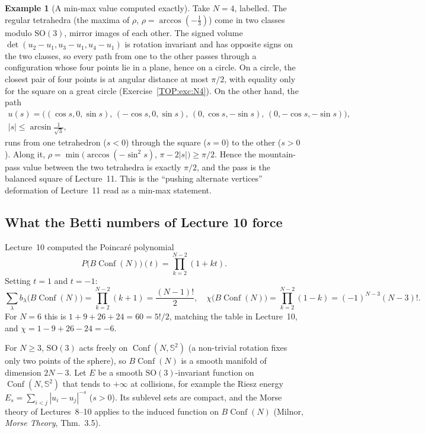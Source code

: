 \documentclass[11pt,openany]{book}
\theoremstyle{plain}
\theoremstyle{definition}
\newtheorem{example}[theorem]{Example}
\theoremstyle{remark}
\newcommand{\Sph}{\mathbb{S}}          %
\newcommand{\SO}{\mathrm{SO}}
\newcommand{\Conf}{\operatorname{Conf}}
\newcommand{\abs}[1]{\left\lvert #1 \right\rvert}
\begin{document}
\begin{example}[A min-max value computed exactly]\label{TOP:ex:N4pass}
Take $N=4$, labelled. The regular tetrahedra (the maxima of $\rho$, $\rho=\arccos(-\tfrac13)$) come
in two classes modulo $\SO(3)$, mirror images of each other. The signed volume
$\det(u_2-u_1,u_3-u_1,u_4-u_1)$ is rotation invariant and has opposite signs on the two classes, so every
path from one to the other passes through a configuration whose four points lie in a plane, hence on a
circle. On a circle, the closest pair of four points is at angular distance at most $\pi/2$, with equality
only for the square on a great circle (Exercise~\ref{TOP:exc:N4}). On the other hand, the path
\[
\begin{gathered}
  u(s)=\big((\cos s,0,\sin s),\,(-\cos s,0,\sin s),\,(0,\cos s,-\sin s),\,(0,-\cos s,-\sin s)\big),\\
  \abs{s}\le\arcsin\tfrac1{\sqrt3},
\end{gathered}
\]
runs from one tetrahedron ($s<0$) through the square ($s=0$) to the other ($s>0$). Along it,
$\rho=\min\big(\arccos(-\sin^2s),\,\pi-2\abs s\big)\ge\pi/2$. Hence the mountain-pass value between the two
tetrahedra is exactly $\pi/2$, and the pass is the balanced square of Lecture~11. This is the
``pushing alternate vertices'' deformation of Lecture~11 read as a min-max statement.
\end{example}

\subsection{What the Betti numbers of Lecture 10 force}

Lecture~10 computed the Poincar\'e polynomial
\[
  P\big(B\Conf(N)\big)(t)=\prod_{k=2}^{N-2}(1+kt).
\]
Setting $t=1$ and $t=-1$:
\[
  \sum_\lambda b_\lambda\big(B\Conf(N)\big)=\prod_{k=2}^{N-2}(k+1)=\frac{(N-1)!}2,\quad
  \chi\big(B\Conf(N)\big)=\prod_{k=2}^{N-2}(1-k)=(-1)^{N-3}(N-3)!.
\]
For $N=6$ this is $1+9+26+24=60=5!/2$, matching the table in Lecture~10, and $\chi=1-9+26-24=-6$.

For $N\ge3$, $\SO(3)$ acts freely on $\Conf(N,\Sph^2)$ (a non-trivial rotation fixes only two points of the
sphere), so $B\Conf(N)$ is a smooth manifold of dimension $2N-3$. Let $E$ be a smooth $\SO(3)$-invariant
function on $\Conf(N,\Sph^2)$ that tends to $+\infty$ at collisions, for example the Riesz energy
$E_s=\sum_{i<j}\abs{u_i-u_j}^{-s}$ ($s>0$). Its sublevel sets are compact, and the Morse theory of
Lectures~8--10 applies to the induced function on $B\Conf(N)$ (Milnor, \emph{Morse Theory}, Thm.~3.5).
\end{document}
